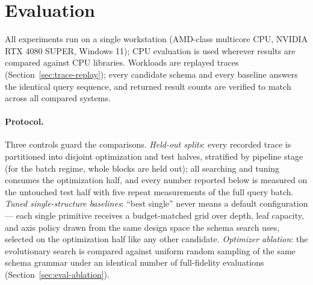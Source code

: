 \section{Evaluation}
\label{sec:evaluation}


All experiments run on a single workstation (AMD-class multicore CPU, NVIDIA RTX 4080 SUPER, Windows 11); CPU evaluation is used wherever results are compared against CPU libraries. Workloads are replayed traces (Section~\ref{sec:trace-replay}); every candidate schema and every baseline answers the identical query sequence, and returned result counts are verified to match across all compared systems.

\paragraph{Protocol.} Three controls guard the comparisons. \emph{Held-out splits}: every recorded trace is partitioned into disjoint optimization and test halves, stratified by pipeline stage (for the batch regime, whole blocks are held out); all searching and tuning consumes the optimization half, and every number reported below is measured on the untouched test half with five repeat measurements of the full query batch. \emph{Tuned single-structure baselines}: ``best single'' never means a default configuration --- each single primitive receives a budget-matched grid over depth, leaf capacity, and axis policy drawn from the same design space the schema search uses, selected on the optimization half like any other candidate. \emph{Optimizer ablation}: the evolutionary search is compared against uniform random sampling of the same schema grammar under an identical number of full-fidelity evaluations (Section~\ref{sec:eval-ablation}).


